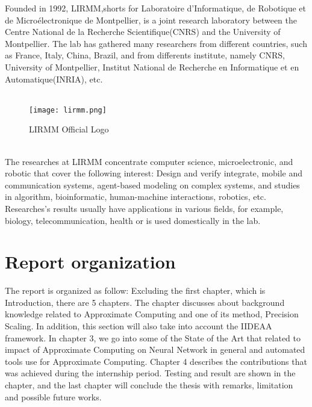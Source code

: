 Founded in 1992, LIRMM,shorts for Laboratoire d'Informatique, de Robotique et de Microélectronique de Montpellier, is a joint research laboratory between the Centre National de la Recherche Scientifique(CNRS) and the University of Montpellier. The lab has gathered many researchers from different countries, such as France, Italy, China, Brazil, and from differents institute, namely CNRS, University of Montpellier, Institut National de Recherche en Informatique et en Automatique(INRIA), etc.~\\
~\\
\begin{figure}[h]
\texttt{[image: lirmm.png]}
\centering
\caption{LIRMM Official Logo}
\end{figure}
~\\
The researches at LIRMM concentrate computer science, microelectronic, and robotic that cover the following interest: Design and verify integrate, mobile and communication systems, agent-based modeling on complex systems, and studies in algorithm, bioinformatic, human-machine interactions, robotics, etc. Researches's results usually have applications in various fields, for example, biology, telecommunication, health or is used domestically in the lab. ~\\ 
\vspace*{1cm}


\section{Report organization}

The report is organized as follow: Excluding the first chapter, which is Introduction, there are 5 chapters. The  chapter discusses about background knowledge related to Approximate Computing and one of its method, Precision Scaling. In addition, this section will also take into account the IIDEAA framework. In chapter 3, we go into some of the State of the Art that related to impact of Approximate Computing on Neural Network in general and automated tools use for Approximate Computing.  Chapter 4 describes the contributions that was achieved during the internship period. Testing and result are shown in the  chapter, and the last chapter will conclude the thesis with remarks, limitation and possible future works. 